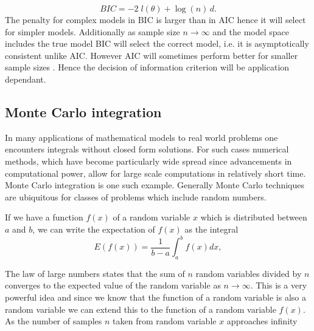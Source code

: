 \begin{equation}
  \label{eq:bic-def}
  BIC = -2 \; l(\theta) + \log(n) \,d.
\end{equation}
The penalty for complex models in BIC is larger than in AIC hence it will select for simpler models. Additionally as sample size $n\rightarrow \infty$ and the model space includes the true model BIC will select the correct model, i.e. it is asymptotically consistent unlike AIC. However AIC will sometimes perform better for smaller sample sizes \citep{hastie2001elements}. Hence the decision of information criterion will be application dependant.

\subsection{Monte Carlo integration}
\label{sec:monte-carlo-integr}

In many applications of mathematical models to real world problems one encounters integrals without closed form solutions. For such cases numerical methods, which have become particularly wide spread since advancements in computational power, allow for large scale computations in relatively short time. Monte Carlo integration is one such example. Generally Monte Carlo techniques are ubiquitous for classes of problems which include random numbers.

If we have a function $f(x)$ of a random variable $x$  which is distributed between $a$ and $b$, we can write the expectation of $f(x)$ as the integral
\begin{equation}
  \label{eq:mc-integ-def}
  E(f(x)) = \frac{1}{b-a} \int_a^b f(x) dx,
\end{equation}

The law of large numbers states that the sum of $n$ random variables divided by $n$ converges to the expected value of the random variable as $n \rightarrow \infty$. This is a very powerful idea and since we know that the function of a random variable is also a random variable we can extend this to the function of a random variable $f(x)$.  As the number of samples $n$ taken from random variable $x$ approaches infinity

